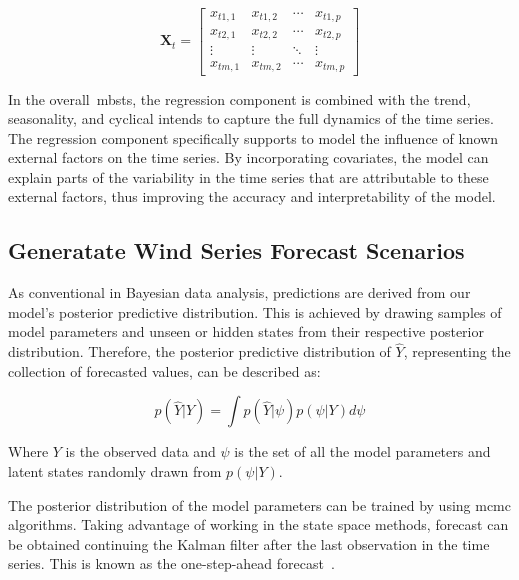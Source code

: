     \begin{equation}
        \bm{X}_t =
            \left[
                \begin{array}{cccc}
                    x_{t1,1} & x_{t1,2} & \cdots & x_{t1,p} \\
                    x_{t2,1} & x_{t2,2} & \cdots & x_{t2,p} \\
                    \vdots  & \vdots  & \ddots & \vdots  \\
                    x_{tm,1} & x_{tm,2} & \cdots & x_{tm,p}
                \end{array}
            \right]
        \label{eq:regression_covariates}
    \end{equation}

    In the overall~\gls{mbsts}, the regression component is combined with the trend, seasonality,
    and cyclical intends to capture the full dynamics of the time series.
    The regression component specifically supports to model the influence of known external factors on the time series.
    By incorporating covariates, the model can explain parts of the variability in the time series that are attributable
    to these external factors, thus improving the accuracy and interpretability of the model.


\subsection{Generatate Wind Series Forecast Scenarios}
    \label{sec:wind_forecast_scenarios}

    As conventional in Bayesian data analysis, predictions are derived from our model's posterior predictive distribution.
    This is achieved by drawing samples of model parameters and unseen or hidden states from their respective posterior distribution.
    Therefore, the posterior predictive distribution of $\hat{Y}$, representing the collection of forecasted values, can be described as:

    \begin{equation}
        p(\hat{Y} | Y) = \int p(\hat{Y} | \psi) p(\psi | Y) d\psi
    \label{eq:posterior_predictive}
    \end{equation}

    Where $Y$ is the observed data and $\psi$ is the set of all the model parameters and latent states randomly drawn from
    $p(\psi | Y)$.

    The posterior distribution of the model parameters can be trained by using \gls{mcmc} algorithms.
    Taking advantage of working in the state space methods, forecast can be obtained continuing the Kalman filter after
    the last observation in the time series.
    This is known as the one-step-ahead forecast~\cite{durbin_time_2012}. \\

